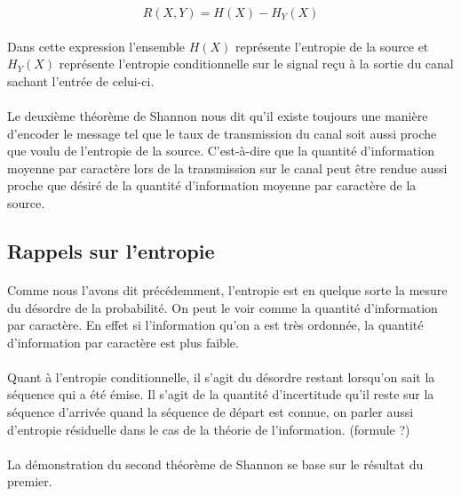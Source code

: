 	\[R(X,Y)=H(X)-H_Y(X)\]
	
	\paragraph{}
	Dans cette expression l'ensemble $H(X)$ représente l'entropie de la
	source et $H_Y(X)$ représente l'entropie conditionnelle sur le signal
	reçu à la sortie du canal sachant l'entrée de celui-ci. 
	
	\paragraph{}
	Le deuxième théorème de Shannon nous dit qu'il existe toujours une 
	manière d'encoder le message tel que le taux de transmission du canal
	soit aussi proche que voulu de l'entropie de la source. C'est-à-dire
	que la quantité d'information moyenne par caractère lors de la 
	transmission sur le canal peut être rendue aussi proche que désiré de 
	la quantité d'information moyenne par caractère de la source.
	
\subsection*{Rappels sur l'entropie}

	\paragraph{}
	Comme nous l'avons dit précédemment, l'entropie est en quelque sorte
	la mesure du désordre de la probabilité. On peut le voir comme la 
	quantité d'information par caractère. En effet si l'information qu'on 
	a est très ordonnée, la quantité d'information par caractère est plus
	faible.
	
	\paragraph{}
	Quant à l'entropie conditionnelle, il s'agit du désordre restant
	lorsqu'on sait la séquence qui a été émise. Il s'agit de la quantité
	d'incertitude qu'il reste sur la séquence d'arrivée quand la séquence
	de départ est connue, on parler aussi d'entropie résiduelle dans le 
	cas de la théorie de l'information. (formule ?)
	
	

	\paragraph{}
	La démonstration du second théorème de Shannon se base sur le 
	résultat du premier. 
	
